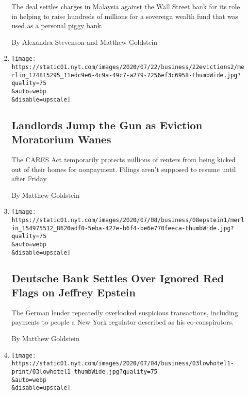\begin{enumerate}
  The deal settles charges in Malaysia against the Wall Street bank for
  its role in helping to raise hundreds of millions for a sovereign
  wealth fund that was used as a personal piggy bank.

  By Alexandra Stevenson and Matthew Goldstein
\item
  \href{/2020/07/23/business/evictions-moratorium-cares-act.html}{}

  \texttt{[image: https://static01.nyt.com/images/2020/07/22/business/22evictions2/merlin\_174815295\_11edc9e6-4c9a-49c7-a279-7256ef3c6958-thumbWide.jpg?quality=75\\\&auto=webp\\\&disable=upscale]}

  \hypertarget{landlords-jump-the-gun-as-eviction-moratorium-wanes}{%
  \subsection{Landlords Jump the Gun as Eviction Moratorium
  Wanes}\label{landlords-jump-the-gun-as-eviction-moratorium-wanes}}

  The CARES Act temporarily protects millions of renters from being
  kicked out of their homes for nonpayment. Filings aren't supposed to
  resume until after Friday.

  By Matthew Goldstein
\item
  \href{/2020/07/07/business/jeffrey-epstein-deutsche-bank-settlement.html}{}

  \texttt{[image: https://static01.nyt.com/images/2020/07/08/business/08epstein1/merlin\_154975512\_8620adf0-5eba-427e-b6f4-be6e770feeca-thumbWide.jpg?quality=75\\\&auto=webp\\\&disable=upscale]}

  \hypertarget{deutsche-bank-settles-over-ignored-red-flags-on-jeffrey-epstein}{%
  \subsection{Deutsche Bank Settles Over Ignored Red Flags on Jeffrey
  Epstein}\label{deutsche-bank-settles-over-ignored-red-flags-on-jeffrey-epstein}}

  The German lender repeatedly overlooked suspicious transactions,
  including payments to people a New York regulator described as his
  co-conspirators.

  By Matthew Goldstein
\item
  \href{/2020/07/03/business/viceroy-beverly-hills-1MDB-fraud.html}{}

  \texttt{[image: https://static01.nyt.com/images/2020/07/04/business/03lowhotel1-print/03lowhotel1-thumbWide.jpg?quality=75\\\&auto=webp\\\&disable=upscale]}


\end{enumerate}
